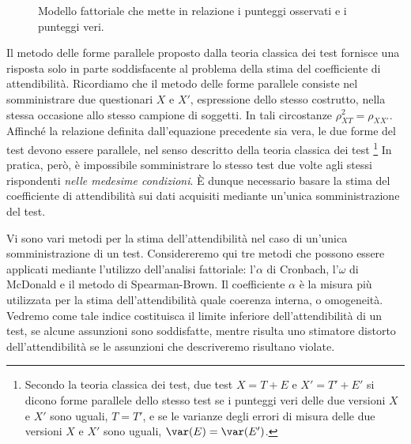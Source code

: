 \begin{figure}
\caption{Modello fattoriale che mette in relazione i punteggi osservati e i punteggi veri.}
\label{fig:fa_cronbach}
\end{figure}

Il metodo delle forme parallele proposto dalla teoria classica dei test fornisce una risposta solo in parte soddisfacente al problema della stima del coefficiente di attendibilità. Ricordiamo che il metodo delle forme parallele consiste nel somministrare due questionari $X$ e $X'$, espressione dello stesso costrutto, nella
 stessa occasione allo stesso campione di soggetti.  In tali circostanze
  $\rho^2_{XT} =  \rho_{XX'}$. Affinché la relazione definita dall'equazione precedente sia vera, le due forme del test devono essere parallele, nel senso descritto  della teoria classica dei test
\footnote{
Secondo la teoria classica dei test, due test $X=T+E$ e
  $X'=T'+E'$ si dicono forme parallele dello stesso
  test  se 
i punteggi veri delle due versioni $X$ e $X'$ sono uguali, 
$
T=T' 
$, e se
 le varianze degli errori di misura  delle due versioni $X$ e $X'$ sono uguali,
$
\var(E) = \var(E')
$.
} 
In pratica, però, è impossibile somministrare  lo stesso test  due volte agli stessi rispondenti \textit{nelle medesime condizioni}. 
È dunque necessario basare la stima del coefficiente di
  attendibilità sui dati acquisiti mediante un'unica somministrazione
  del test.

Vi sono vari metodi per la stima  dell'attendibilità nel caso di un'unica somministrazione di un test.  Considereremo qui tre metodi che possono essere applicati mediante l'utilizzo  dell'analisi fattoriale: l'$\alpha$ di Cronbach, l'$\omega$ di McDonald e il metodo di Spearman-Brown. Il coefficiente $\alpha$ è la misura più utilizzata per la stima dell'attendibilità quale coerenza interna, o omogeneità.  Vedremo come tale indice  costituisca il limite inferiore  dell'attendibilità di un test, se alcune assunzioni sono soddisfatte, mentre risulta uno stimatore distorto dell'attendibilità se le assunzioni che descriveremo risultano violate.  

